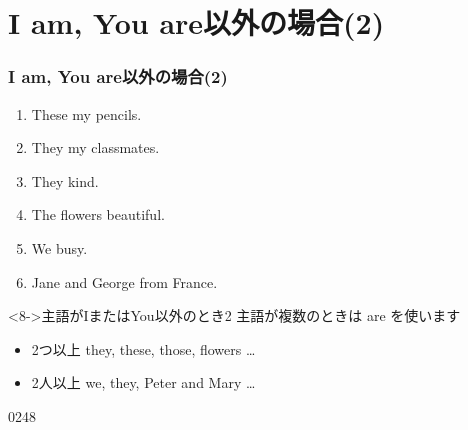 \documentclass[aspectratio=169,xcolor={dvipsnames,table}]{beamer}
\begin{document}
\section{I am, You are以外の場合(2)}

\begin{frame}[plain]\frametitle{I am, You are以外の場合(2)}
  \begin{enumerate}
   \item<1-> These \textbf{\color{Maroon}{are}} my pencils. \hfill{}
   \item<1-> They \textbf{\color{Maroon}{are}} my classmates. \hfill{}
   \item<1-> They \textbf{\color{Maroon}{are}} kind. \hfill{}
   \item<1-> The flowers \textbf{\color{Maroon}{are}} beautiful. \hfill{}
   \item<1-> We \textbf{\color{Maroon}{are}} busy. \hfill{}
   \item<1-> Jane and George \textbf{\color{Maroon}{are}} from France. \hfill{}
  \end{enumerate}

\bigskip

\begin{block}<8->{主語がIまたはYou以外のとき2}\small
主語が複数のときは are を使います
\begin{itemize}[square]\small
 \item 2つ以上 they, these, those, flowers \ldots
 \item 2人以上 we, they, Peter and Mary \ldots
\end{itemize}
     \end{block}


\hfill{\tiny 0248}\,{\scriptsize {}}

\end{frame}
\end{document}

